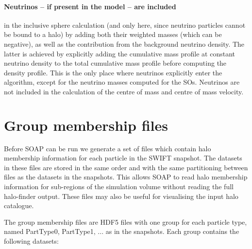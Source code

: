 \documentclass{article}
\begin{document}
\paragraph{Neutrinos -- if present in the model -- are included} in the inclusive sphere calculation (and only 
here, since neutrino particles cannot be bound to a halo) by adding both their weighted masses (which can be 
negative), as well as the contribution from the background neutrino density. The latter is achieved by 
explicitly adding the cumulative mass profile at constant neutrino density to the total cumulative mass 
profile before computing the density profile. This is the only place where neutrinos explicitly enter the 
algorithm, except for the neutrino masses computed for the SOs. Neutrinos are not included in the calculation 
of the centre of mass and centre of mass velocity.

\section{Group membership files}

Before SOAP can be run we generate a set of files which contain halo
membership information for each particle in the SWIFT snapshot. The
datasets in these files are stored in the same order and with the same
partitioning between files as the datasets in the snapshots. This
allows SOAP to read halo membership information for sub-regions of the
simulation volume without reading the full halo-finder output. These files may
also be useful for visualising the input halo catalogue.

The group membership files are HDF5 files with one group for each
particle type, named PartType0, PartType1, ... as in the
snapshots. Each group contains the following datasets:
\end{document}

